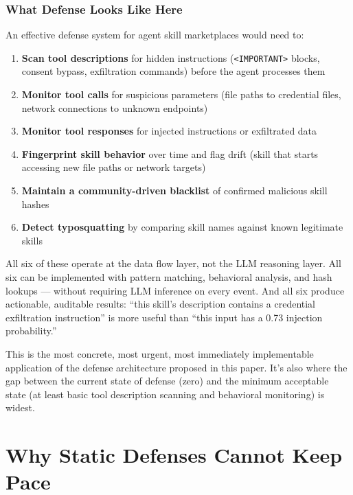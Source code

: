 \documentclass[11pt,letterpaper]{article}
\begin{document}
\subsubsection{What Defense Looks Like Here}

An effective defense system for agent skill marketplaces would need to:

\begin{enumerate}
\item \textbf{Scan tool descriptions} for hidden instructions (\texttt{<IMPORTANT>} blocks, consent bypass, exfiltration commands) before the agent processes them
\item \textbf{Monitor tool calls} for suspicious parameters (file paths to credential files, network connections to unknown endpoints)
\item \textbf{Monitor tool responses} for injected instructions or exfiltrated data
\item \textbf{Fingerprint skill behavior} over time and flag drift (skill that starts accessing new file paths or network targets)
\item \textbf{Maintain a community-driven blacklist} of confirmed malicious skill hashes
\item \textbf{Detect typosquatting} by comparing skill names against known legitimate skills
\end{enumerate}

All six of these operate at the data flow layer, not the LLM reasoning layer. All six can be implemented with pattern matching, behavioral analysis, and hash lookups --- without requiring LLM inference on every event. And all six produce actionable, auditable results: ``this skill's description contains a credential exfiltration instruction'' is more useful than ``this input has a 0.73 injection probability.''

This is the most concrete, most urgent, most immediately implementable application of the defense architecture proposed in this paper. It's also where the gap between the current state of defense (zero) and the minimum acceptable state (at least basic tool description scanning and behavioral monitoring) is widest.


\section{Why Static Defenses Cannot Keep Pace}
\label{sec:staticdefense}
\end{document}
